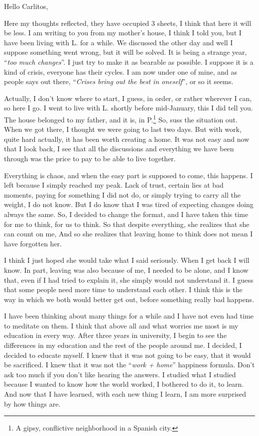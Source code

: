 \documentclass[]{book}
\let\rmarkdownfootnote\footnote%
\def\footnote{\protect\rmarkdownfootnote}
\begin{document}
Hello Carlitos,

Here my thoughts reflected, they have occupied 3 sheets, I think that here it will be less. I am writing to you from my mother's house, I think I told you, but I have been living with L. for a while. We discussed the other day and well I suppose something went wrong, but it will be solved. It is being a strange year, ``\emph{too much changes}''. I just try to make it as bearable as possible. I suppose it is a kind of crisis, everyone has their cycles. I am now under one of mine, and as people says out there, ``\emph{Crises bring out the best in oneself}'', or so it seems.

Actually, I don't know where to start, I guess, in order, or rather wherever I can, so here I go. I went to live with L. shortly before mid-January, this I did tell you. The house belonged to my father, and it is, in P.\footnote{A gipsy, conflictive neighborhood in a Spanish city.} So, suss the situation out. When we got there, I thought we were going to last two days. But with work, quite hard actually, it has been worth creating a home. It was not easy and now that I look back, I see that all the discussions and everything we have been through was the price to pay to be able to live together.

Everything is chaos, and when the easy part is supposed to come, this happens. I left because I simply reached my peak. Lack of trust, certain lies at bad moments, paying for something I did not do, or simply trying to carry all the weight, I do not know. But I do know that I was tired of expecting changes doing always the same. So, I decided to change the format, and I have taken this time for me to think, for us to think. So that despite everything, she realizes that she can count on me, And so she realizes that leaving home to think does not mean I have forgotten her.

I think I just hoped she would take what I said seriously. When I get back I will know. In part, leaving was also because of me, I needed to be alone, and I know that, even if I had tried to explain it, she simply would not understand it. I guess that some people need more time to understand each other. I think this is the way in which we both would better get out, before something really bad happens.

I have been thinking about many things for a while and I have not even had time to meditate on them. I think that above all and what worries me most is my education in every way. After three years in university, I begin to see the differences in my education and the rest of the people around me. I decided, I decided to educate myself. I knew that it was not going to be easy, that it would be sacrificed. I knew that it was not the ``\emph{work + home}'' happiness formula. Don't ask too much if you don't like hearing the answers. I studied what I studied because I wanted to know how the world worked, I bothered to do it, to learn. And now that I have learned, with each new thing I learn, I am more surprised by how things are.
\end{document}
